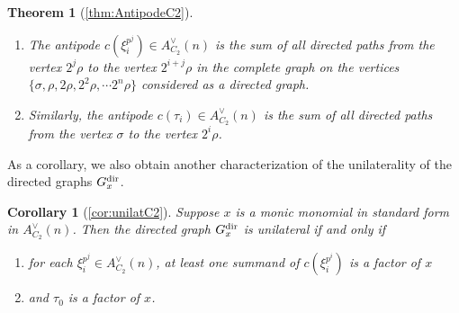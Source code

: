 \documentclass{amsart}
\newtheorem*{thm*}{Theorem}
\newtheorem*{cor*}{Corollary}
\theoremstyle{definition}
\theoremstyle{plain}
\numberwithin{theorem}{section}
\numberwithin{equation}{section}
\numberwithin{figure}{section}
\newcommand{\0}{\langle 0 \rangle }
\begin{document}
\begin{thm*}[\cref{thm:AntipodeC2}]
\hfill 
\begin{enumerate}

    \item[I.] %
    The antipode $c(\xi_i^{p^j}) \in A^\vee_{C_2}(n)$ is the sum of all directed paths from the vertex $2^j \rho$ to the vertex $2^{i + j} \rho$ in the complete graph on the vertices $\{\sigma, \rho, 2 \rho, 2^2 \rho, \cdots 2^n \rho\}$ considered as a directed graph.

    \item[II.] Similarly, the antipode $c(\tau_i) \in A^\vee_{C_2} (n)$ is the sum of all directed paths from the vertex $\sigma$ to the vertex $2^i \rho$.
    \color{black}
\end{enumerate}
\end{thm*}

As a corollary, we also obtain another characterization of the unilaterality of the directed graphs $G_x^\textup{dir}$.

\begin{cor*}[\cref{cor:unilatC2}]
    Suppose $x$ is a monic monomial { in standard form} in $A_{C_2}^\vee (n)$. Then the directed graph $G_x^{\textup{dir}}$ is unilateral if and only if
    \begin{enumerate}
        \item for each $\xi_i^{p^j} \in A_{C_2}^\vee (n)$, at least one summand of $c(\xi_i^{p^i})$ is a factor of $x$
        \item and $\tau_0$ is a factor of $x$.
    \end{enumerate}
\end{cor*}
\end{document}
